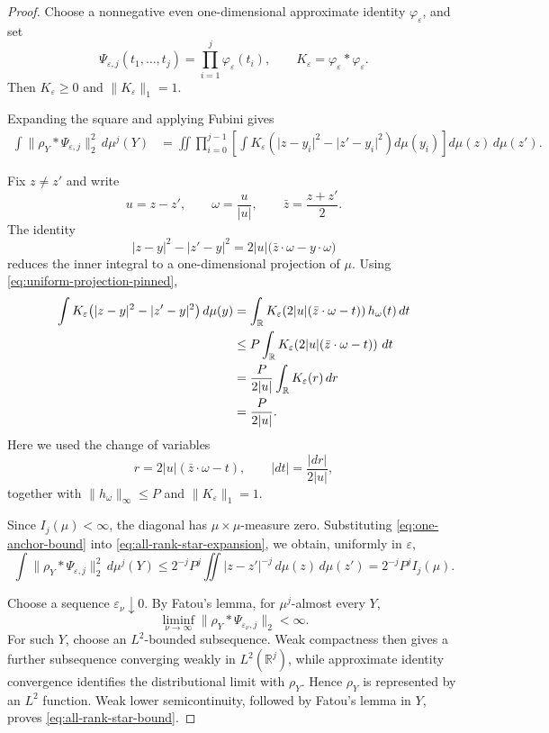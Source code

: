 \documentclass[11pt]{article}
\theoremstyle{remark}
\newcommand{\R}{\mathbb R}
\newcommand{\eps}{\varepsilon}
\numberwithin{equation}{section}
\newcommand{\1}{\mathbf 1}
\begin{document}
\begin{proof}
Choose a nonnegative even one-dimensional approximate identity
\(\varphi_\eps\), and set
\[
\Psi_{\eps,j}(t_1,\ldots,t_j)
=
\prod_{i=1}^j\varphi_\eps(t_i),
\qquad
K_\eps=\varphi_\eps*\varphi_\eps.
\]
Then \(K_\eps\geq0\) and \(\|K_\eps\|_1=1\).

Expanding the square and applying Fubini gives
\begin{align}
\int
\|\rho_Y*\Psi_{\eps,j}\|_2^2\,d\mu^j(Y)
&=
\iint
\prod_{i=0}^{j-1}
\left[
\int
K_\eps\!\left(
\lvert z-y_i\rvert^2
-
\lvert z'-y_i\rvert^2
\right)
d\mu(y_i)
\right]
d\mu(z)\,d\mu(z').
\label{eq:all-rank-star-expansion}
\end{align}

Fix \(z\neq z'\) and write
\[
u=z-z',
\qquad
\omega=\frac{u}{\lvert u\rvert},
\qquad
\bar z=\frac{z+z'}2.
\]
The identity
\begin{equation}
\lvert z-y\rvert^2-\lvert z'-y\rvert^2
=
2\lvert u\rvert
\bigl(\bar z\cdot\omega-y\cdot\omega\bigr)
\label{eq:bisector-linear}
\end{equation}
reduces the inner integral to a one-dimensional projection of \(\mu\).
Using \eqref{eq:uniform-projection-pinned},
\begin{align}
\int
K_\eps\!\left(
\lvert z-y\rvert^2-\lvert z'-y\rvert^2
\right)
d\mu(y)
&=
\int_\R
K_\eps\!\left(
2\lvert u\rvert(\bar z\cdot\omega-t)
\right)
h_\omega(t)\,dt \notag\\
&\leq
P\int_\R
K_\eps\!\left(
2\lvert u\rvert(\bar z\cdot\omega-t)
\right)\,dt \notag\\
&=
\frac{P}{2\lvert u\rvert}
\int_\R K_\eps(r)\,dr \notag\\
&=
\frac{P}{2\lvert u\rvert}.
\label{eq:one-anchor-bound}
\end{align}
Here we used the change of variables
\[
r=2\lvert u\rvert(\bar z\cdot\omega-t),
\qquad
\lvert dt\rvert=\frac{\lvert dr\rvert}{2\lvert u\rvert},
\]
together with \(\|h_\omega\|_\infty\leq P\) and
\(\|K_\eps\|_1=1\).

Since \(I_j(\mu)<\infty\), the diagonal has
\(\mu\times\mu\)-measure zero.  Substituting
\eqref{eq:one-anchor-bound} into
\eqref{eq:all-rank-star-expansion}, we obtain, uniformly in \(\eps\),
\[
\int
\|\rho_Y*\Psi_{\eps,j}\|_2^2\,d\mu^j(Y)
\leq
2^{-j}P^j
\iint
\lvert z-z'\rvert^{-j}\,d\mu(z)\,d\mu(z')
=
2^{-j}P^j I_j(\mu).
\]

Choose a sequence \(\eps_\nu\downarrow0\).  By Fatou's lemma,
for \(\mu^j\)-almost every \(Y\),
\[
\liminf_{\nu\to\infty}
\|\rho_Y*\Psi_{\eps_\nu,j}\|_2
<\infty.
\]
For such \(Y\), choose an \(L^2\)-bounded subsequence.  Weak compactness
then gives a further subsequence converging weakly in \(L^2(\R^j)\), while
approximate identity convergence identifies the distributional limit
with \(\rho_Y\).  Hence \(\rho_Y\) is represented by an \(L^2\)
function.  Weak lower semicontinuity, followed by Fatou's lemma in
\(Y\), proves \eqref{eq:all-rank-star-bound}.
\end{proof}
\end{document}
